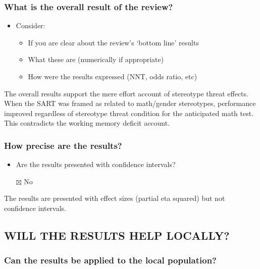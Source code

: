 \documentclass[
  doc, a4paper]{apa7}
\providecommand{\tightlist}{%
  \setlength{\itemsep}{0pt}\setlength{\parskip}{0pt}}
\begin{document}
\subsubsection{What is the overall result of the review?}\label{what-is-the-overall-result-of-the-review}

\begin{itemize}
\tightlist
\item
  Consider:

  \begin{itemize}
  \tightlist
  \item
    If you are clear about the review's `bottom line' results
  \item
    What these are (numerically if appropriate)
  \item
    How were the results expressed (NNT, odds ratio, etc)
  \end{itemize}
\end{itemize}

The overall results support the mere effort account of stereotype threat effects. When the SART was framed as related to math/gender stereotypes, performance improved regardless of stereotype threat condition for the anticipated math test. This contradicts the working memory deficit account.

\subsubsection{How precise are the results?}\label{how-precise-are-the-results}

\begin{itemize}
\tightlist
\item
  Are the results presented with confidence intervals?
\item[$\boxtimes$]
  No
\end{itemize}

The results are presented with effect sizes (partial eta squared) but not confidence intervals.

\subsection{WILL THE RESULTS HELP LOCALLY?}\label{will-the-results-help-locally}

\subsubsection{Can the results be applied to the local population?}\label{can-the-results-be-applied-to-the-local-population}
\end{document}
